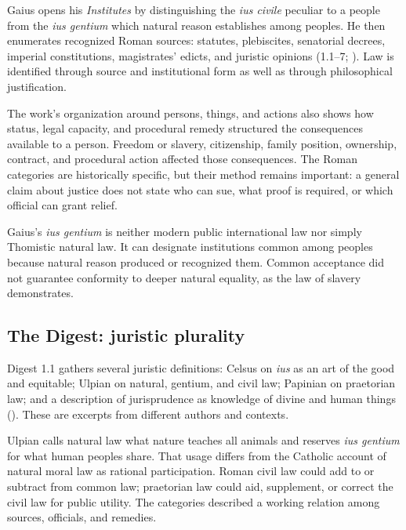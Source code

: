Gaius opens his \emph{Institutes} by distinguishing the \emph{ius civile} peculiar to a people from the \emph{ius gentium} which natural reason establishes among peoples. He then enumerates recognized Roman sources: statutes, plebiscites, senatorial decrees, imperial constitutions, magistrates' edicts, and juristic opinions (1.1--7; ). Law is identified through source and institutional form as well as through philosophical justification.

The work's organization around persons, things, and actions also shows how status, legal capacity, and procedural remedy structured the consequences available to a person. Freedom or slavery, citizenship, family position, ownership, contract, and procedural action affected those consequences. The Roman categories are historically specific, but their method remains important: a general claim about justice does not state who can sue, what proof is required, or which official can grant relief.

Gaius's \emph{ius gentium} is neither modern public international law nor simply Thomistic natural law. It can designate institutions common among peoples because natural reason produced or recognized them. Common acceptance did not guarantee conformity to deeper natural equality, as the law of slavery demonstrates.

\subsection{The Digest: juristic plurality}

Digest 1.1 gathers several juristic definitions: Celsus on \emph{ius} as an art of the good and equitable; Ulpian on natural, gentium, and civil law; Papinian on praetorian law; and a description of jurisprudence as knowledge of divine and human things (). These are excerpts from different authors and contexts.

Ulpian calls natural law what nature teaches all animals and reserves \emph{ius gentium} for what human peoples share. That usage differs from the Catholic account of natural moral law as rational participation. Roman civil law could add to or subtract from common law; praetorian law could aid, supplement, or correct the civil law for public utility. The categories described a working relation among sources, officials, and remedies.

